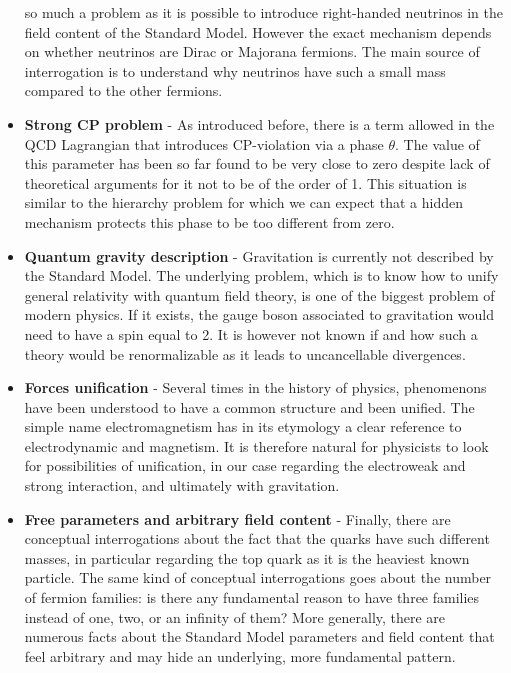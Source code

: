 \begin{itemize}
            so much a problem as it is possible to introduce right-handed neutrinos in the
            field content of the Standard Model. However the exact mechanism depends on
            whether neutrinos are Dirac or Majorana fermions. The main source of interrogation
            is to understand why neutrinos have such a small mass compared to the other
            fermions.
        \item \textbf{Strong CP problem} - As introduced before, there is a term allowed in
            the QCD Lagrangian that introduces CP-violation via a phase $\theta$. The value
            of this parameter has been so far found to be very close to zero despite
            lack of theoretical arguments for it not to be of the order of 1. This situation
            is similar to the hierarchy problem for which we can expect that a
            hidden mechanism protects this phase to be too different from zero.
        \item \textbf{Quantum gravity description} - Gravitation is currently not described
            by the Standard Model. The underlying problem, which is to know how to unify general
            relativity with quantum field theory, is one of the biggest problem of modern
            physics. If it exists, the gauge boson associated to gravitation would
            need to have a spin equal to 2. It is however not known if and how such
            a theory would be renormalizable as it leads to uncancellable divergences.
        \item \textbf{Forces unification} - Several times in the history of physics,
            phenomenons have been understood to have a common structure and
            been unified. The simple name electromagnetism has in its etymology a clear
            reference to electrodynamic and magnetism. It is therefore natural for physicists
            to look for possibilities of unification, in our case regarding the electroweak
            and strong interaction, and ultimately with gravitation.
        \item \textbf{Free parameters and arbitrary field content} -
            Finally, there are conceptual interrogations about the fact that the quarks have
            such different masses, in particular regarding the top quark as it is the
            heaviest known particle. The same kind of conceptual interrogations goes about
            the number of fermion families: is there any fundamental reason to have three
            families instead of one, two, or an infinity of them? More generally, there
            are numerous facts about the Standard Model parameters and field content that
            feel arbitrary and may hide an underlying, more fundamental pattern.
    \end{itemize}


